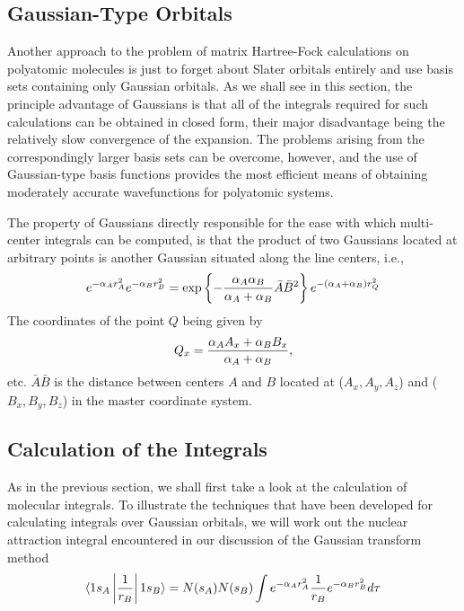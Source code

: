 \subsection{Gaussian-Type Orbitals}

Another approach to the problem of matrix Hartree-Fock calculations
on polyatomic molecules is just to forget about Slater orbitals entirely 
and use basis sets containing only Gaussian orbitals. As we shall see in this 
section, the principle advantage of Gaussians is that all of the integrals 
required for such calculations can be obtained in closed form, their major 
disadvantage being the relatively slow convergence of the expansion. The 
problems arising from the correspondingly larger basis sets can be 
overcome, however, and the use of Gaussian-type basis functions provides 
the most efficient means  of obtaining moderately accurate wavefunctions 
for polyatomic systems.

The property of Gaussians directly responsible for the ease with which
multi-center integrals can be computed, is that the product of two 
Gaussians located at arbitrary points is another Gaussian situated along the 
line centers, i.e.,
\begin{equation}
e^{-\alpha_A r^2_A} e^{-\alpha_Br^2_B} = \exp \left\{ - {\alpha_A 
\alpha_B \over \alpha_A + \alpha_B} {\bar{A}} {\bar{B}}^2 \right\} 
e^{-(\alpha_A+\alpha_B)r^2_Q}
\label{chap15app-eqno3}
\end{equation}
The coordinates of the point $Q$ being given by
\begin{equation}
Q_x = {\alpha_AA_x + \alpha_BB_x \over \alpha_A + \alpha_B},
\end{equation}
etc.  ${\bar{A}}{\bar{B}}$ is the distance between centers $A$ and $B$ 
located at ($A_x , A_y, A_z$) and ($B_x , B_y, B_z$) in the master 
coordinate system.

\subsection{Calculation of the Integrals}

As in the previous section, we shall first take a look at the calculation
of molecular integrals.  To illustrate the techniques that have been 
developed for calculating integrals over Gaussian orbitals, we will work 
out the  nuclear attraction integral encountered in our discussion of the 
Gaussian transform method
\begin{equation}
\langle 1s_A \left| {1 \over r_B} \right| 1s_B \rangle = N(s_A)N(s_B) 
\int e^{-\alpha_Ar^2_A} {1 \over r_B} e^{-\alpha_Br^2_B} d \tau
\label{chap15app-eqno4}
\end{equation}

